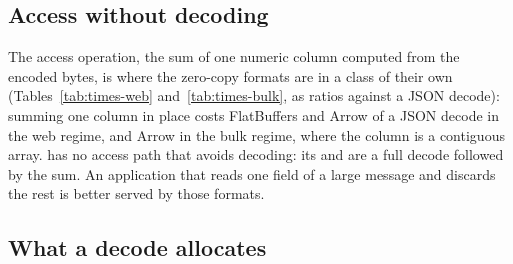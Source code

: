 \FloatBarrier
\subsection{Access without decoding}

The access operation, the sum of one numeric column computed from the
encoded bytes, is where the zero-copy formats are in a class of their own
(Tables~\ref{tab:times-web} and~\ref{tab:times-bulk}, as ratios against a
JSON decode): summing one column in place costs FlatBuffers
 and Arrow
 of a JSON decode in the web regime, and Arrow
 in the bulk regime, where the column is a
contiguous array. \colbin{} has no access path that avoids decoding: its
 and  are a
full decode followed by the sum. An application that reads one field of a
large message and discards the rest is better served by those formats.

\FloatBarrier
\subsection{What a decode allocates}
\label{sec:memory}

\begin{table}[t]
\centering\scriptsize
\setlength{\tabcolsep}{3pt}
\caption{Memory by kind of message: how many times fewer bytes, and how many
times fewer allocations, \colbin{} needs than each format to decode a
message into a fresh value, on the cases both carry, and the cases in which
\colbin{} needs strictly fewer. Bold, below 1: the other format needs
fewer.}
\label{tab:memory}
\end{table}

